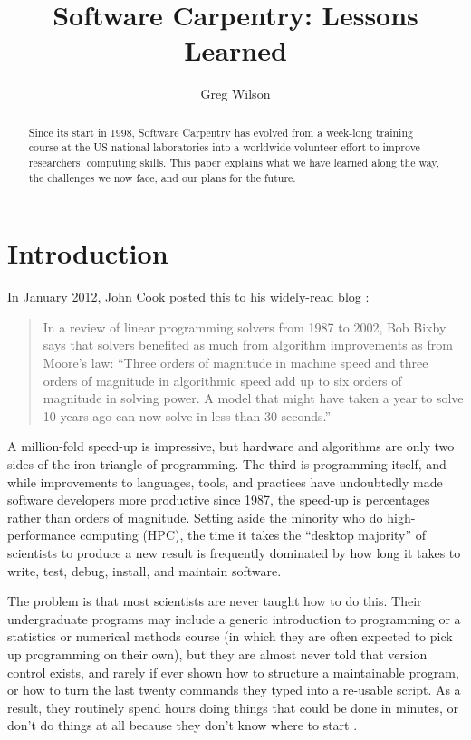 \documentclass[10pt,a4paper,twocolumn]{article}
\begin{document}
\title{Software Carpentry: Lessons Learned}
\author[1]{Greg Wilson}

\maketitle
\thispagestyle{fancy}

\begin{abstract}

Since its start in 1998, Software Carpentry has evolved from a
week-long training course at the US national laboratories into a
worldwide volunteer effort to improve researchers' computing
skills. This paper explains what we have learned along the way, the
challenges we now face, and our plans for the future.

\end{abstract}
\clearpage

\section{Introduction}

In January 2012, John Cook posted this to his widely-read blog
\cite{cook2012}:

\begin{quote}
In a review of linear programming solvers from 1987 to 2002, Bob Bixby
says that solvers benefited as much from algorithm improvements as from
Moore's law: ``Three orders of magnitude in machine speed and three
orders of magnitude in algorithmic speed add up to six orders of
magnitude in solving power. A model that might have taken a year to
solve 10 years ago can now solve in less than 30 seconds.''
\end{quote}

A million-fold speed-up is impressive, but hardware and algorithms are
only two sides of the iron triangle of programming. The third is
programming itself, and while improvements to languages, tools, and
practices have undoubtedly made software developers more productive
since 1987, the speed-up is percentages rather than orders of
magnitude.  Setting aside the minority who do high-performance
computing (HPC), the time it takes the ``desktop majority'' of
scientists to produce a new result is frequently dominated by how long
it takes to write, test, debug, install, and maintain software.

The problem is that most scientists are never taught how to do
this. Their undergraduate programs may include a generic introduction
to programming or a statistics or numerical methods course (in which
they are often expected to pick up programming on their own), but they
are almost never told that version control exists, and rarely if ever
shown how to structure a maintainable program, or how to turn the last
twenty commands they typed into a re-usable script. As a result, they
routinely spend hours doing things that could be done in minutes, or
don't do things at all because they don't know where to start
\cite{hannay2009,prabhu2011}.
\end{document}
